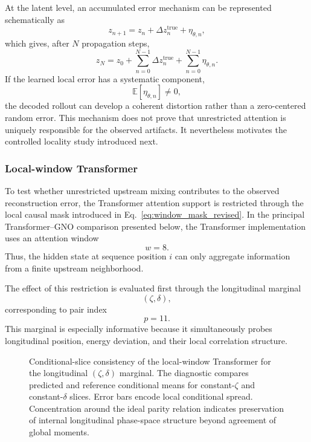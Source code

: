 At the latent level, an accumulated error mechanism can be represented schematically as
\begin{equation}
z_{n+1}
=
z_n
+
\Delta z_n^{\mathrm{true}}
+
\eta_{\theta,n},
\end{equation}
which gives, after \(N\) propagation steps,
\begin{equation}
z_N
=
z_0
+
\sum_{n=0}^{N-1}
\Delta z_n^{\mathrm{true}}
+
\sum_{n=0}^{N-1}
\eta_{\theta,n}.
\label{eq:latent_error_accumulation}
\end{equation}
If the learned local error has a systematic component,
\begin{equation}
\mathbb{E}
\left[
\eta_{\theta,n}
\right]
\neq 0,
\end{equation}
the decoded rollout can develop a coherent distortion rather than a zero-centered random error. This mechanism does not prove that unrestricted attention is uniquely responsible for the observed artifacts. It nevertheless motivates the controlled locality study introduced next.

\subsubsection{Local-window Transformer}
\label{subsubsec:results_window_transformer}

To test whether unrestricted upstream mixing contributes to the observed reconstruction error, the Transformer attention support is restricted through the local causal mask introduced in Eq.~\eqref{eq:window_mask_revised}. In the principal Transformer--GNO comparison presented below, the Transformer implementation uses an attention window
\begin{equation}
w=8.
\end{equation}
Thus, the hidden state at sequence position \(i\) can only aggregate information from a finite upstream neighborhood.

The effect of this restriction is evaluated first through the longitudinal marginal
\begin{equation}
(\zeta,\delta),
\end{equation}
corresponding to pair index
\begin{equation}
p=11.
\end{equation}
This marginal is especially informative because it simultaneously probes longitudinal position, energy deviation, and their local correlation structure.

\begin{figure}[H]
\centering
{}
\caption{
Conditional-slice consistency of the local-window Transformer for the longitudinal \((\zeta,\delta)\) marginal. The diagnostic compares predicted and reference conditional means for constant-\(\zeta\) and constant-\(\delta\) slices. Error bars encode local conditional spread. Concentration around the ideal parity relation indicates preservation of internal longitudinal phase-space structure beyond agreement of global moments.
}
\label{fig:tf_conditionals_longitudinal}
\end{figure}

